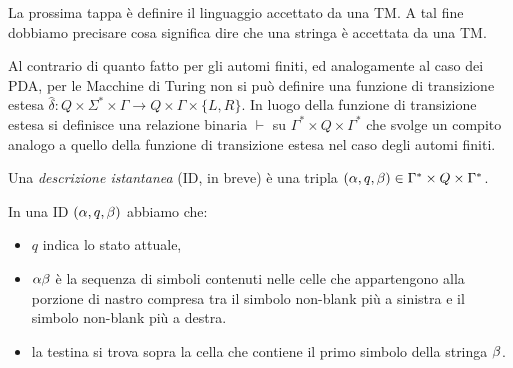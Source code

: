 \documentclass[runningheads,a4paper]{llncs}
\begin{document}
La prossima tappa \`{e} definire il linguaggio accettato da una TM. A tal fine dobbiamo precisare cosa significa dire che una stringa \`{e} accettata da una TM.

Al contrario di quanto fatto per gli automi finiti, ed analogamente al caso dei PDA, per le Macchine di Turing non si pu\`{o} definire una funzione di transizione estesa $\hat{\delta}: Q\times\Sigma^* \times \Gamma \to Q\times\Gamma\times\{L,R\}$. In luogo della funzione di transizione estesa si definisce una relazione binaria $\vdash$ su $\Gamma^* \times Q \times \Gamma^*$ che svolge un compito analogo a quello della funzione di transizione estesa nel caso degli automi finiti.

\begin{definition}\label{def:ID}
Una \emph{descrizione istantanea} (ID, in breve) \`{e} una tripla $(\alpha,q,\beta) \in \Gamma^* \times Q \times \Gamma^*$.
\end{definition}

In una ID $(\alpha,q,\beta)$ abbiamo che:
\begin{itemize}
\item $q$ indica lo stato attuale,
\item $\alpha\beta$ \`{e} la sequenza di simboli contenuti nelle celle che appartengono alla porzione di nastro compresa tra il simbolo non-blank pi\`{u} a sinistra e il simbolo non-blank pi\`{u} a destra.
\item la testina si trova sopra la cella che contiene il primo simbolo della stringa $\beta$.
\end{itemize}
\end{document}
